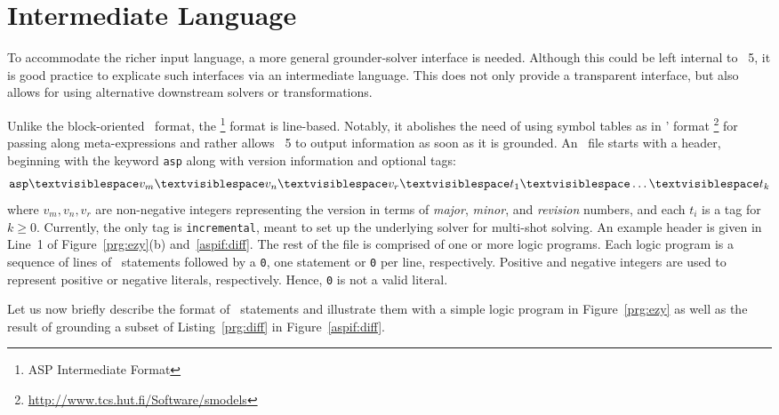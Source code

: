 
\section{Intermediate Language}\label{sec:aspif}
\newcommand\Space{\textvisiblespace}%

To accommodate the richer input language, a more general grounder-solver interface is needed.
Although this could be left internal to \clingo~5,
it is good practice to explicate such interfaces via an intermediate language.
This does not only provide a transparent interface, but also allows for using alternative downstream solvers or transformations.

Unlike the block-oriented \smodels\ format,
the \aspif\footnote{ASP Intermediate Format} format is line-based.
Notably, it abolishes the need of using symbol tables as in \smodels' format%
\footnote{\url{http://www.tcs.hut.fi/Software/smodels}}
for passing along meta-expressions and rather allows \gringo~5 to output information as soon as it is grounded.
An \aspif\ file starts with a header, beginning with the keyword \lstinline{asp}
along with version information and optional tags:
\[\texttt{asp} \Space v_m \Space v_n \Space v_r \Space t_1 \Space \dots \Space t_k \]
where $v_m,v_n,v_r$ are non-negative integers representing the version in terms of \textit{major}, \textit{minor}, and \textit{revision} numbers,
and each $t_i$ is a tag for $k\geq 0$.
Currently, the only tag is \lstinline{incremental}, meant to set up the underlying solver for multi-shot solving.
An example header is given in Line~1 of Figure~\ref{prg:ezy}(b) and~\ref{aspif:diff}.
%
The rest of the file is comprised of one or more logic programs.
Each logic program is a sequence of lines of \aspif\ statements followed by a \lstinline{0}, one statement or \lstinline{0} per line, respectively.
%
Positive and negative integers are used to represent positive or  negative literals, respectively.
Hence, \lstinline{0} is not a valid literal.

Let us now briefly describe the format of \aspif\ statements and illustrate them with a
simple logic program in Figure~\ref{prg:ezy} as well as the result of grounding a subset of Listing~\ref{prg:diff}
in Figure~\ref{aspif:diff}. %

